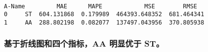 \documentclass[11pt]{article}
\begin{document}
    \begin{center}
    \end{center}
    { \hspace*{\fill} \\}
    
    \begin{Verbatim}[commandchars=\\\{\}]
  A-Name         MAE      MAPE            MSE        RMSE
0     ST  604.131868  0.179989  464393.648352  681.464341
1     AA  288.802198  0.082077  137497.043956  370.805938

    \end{Verbatim}

    \subsubsection{基于折线图和四个指标，AA 明显优于
ST。}\label{ux57faux4e8eux6298ux7ebfux56feux548cux56dbux4e2aux6307ux6807aa-ux660eux663eux4f18ux4e8e-st}


    
    
    
    
\end{document}
